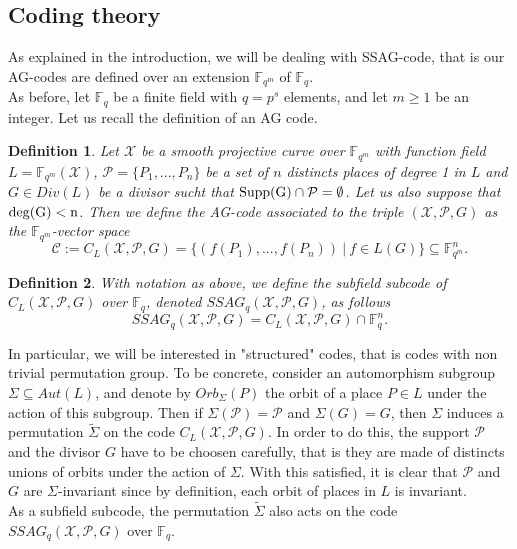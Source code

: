 \documentclass[10pt]{article}
\newtheorem{def1}{Definition}[]
\newcommand{\s}{\vspace{0.3cm}}
\newcommand{\fqm}{\mathbb{F}_{q^m}}
\newcommand{\fq}{\mathbb{F}_q}
\newcommand{\su}{\subseteq}
\newcommand{\X}{\mathcal{X}}
\newcommand{\PR}{\mathcal{P}}
\begin{document}
\s

\subsection{Coding theory}

\s

As explained in the introduction, we will be dealing with SSAG-code, that is our AG-codes are defined over an extension $\fqm$ of $\fq$. \\
As before, let $\fq$ be a finite field with $q=p^s$ elements, and let $m \geq 1$ be an integer. Let us recall the definition of an AG code.

\s

\begin{def1}
Let $\X$ be a smooth projective curve over $\fqm$ with function field $L = \fqm(\X)$, $\PR = \{P_1,...,P_n\}$ be a set of $n$ distincts places of degree 1 in $L$  and $G \in Div(L)$ be a divisor sucht that $\rm{Supp}(G) \cap \PR = \emptyset$. Let us also suppose that $\rm{deg}(G)<n$. Then we define the AG-code associated to the triple $(\X,\PR,G)$ as the $\fqm$-vector space
\[\mathcal{C} := C_L(\X,\PR,G) = \{ (f(P_1),...,f(P_n)) \ | \ f \in L(G)\} \su \fqm^n.\]
\end{def1}

\s

\begin{def1}
With notation as above, we define the subfield subcode of $C_L(\X,\PR,G)$ over $\fq$, denoted $SSAG_q(\X,\PR,G)$, as follows
\[ SSAG_q(\X,\PR,G) = C_L(\X,\PR,G) \cap \fq^n.\]
\end{def1}

\s

In particular, we will be interested in "structured" codes, that is codes with non trivial permutation group. To be concrete, consider an automorphism subgroup $\Sigma \su Aut(L)$, and denote by $Orb_{\Sigma}(P)$ the orbit of a place $P \in L$ under the action of this subgroup. Then if $\Sigma(\PR) = \PR$ and $\Sigma(G)=G$, then $\Sigma$ induces a permutation $\tilde{\Sigma}$ on the code $C_L(\X,\PR,G)$. In order to do this, the support $\PR$ and the divisor $G$ have to be choosen carefully, that is they are made of distincts unions of orbits under the action of $\Sigma$. With this satisfied, it is clear that $\PR$ and $G$ are $\Sigma$-invariant since by definition, each orbit of places in $L$ is invariant. \\
As a subfield subcode, the permutation $\tilde{\Sigma}$ also acts on the code $SSAG_q(\X,\PR,G)$ over $\fq$.
\end{document}
